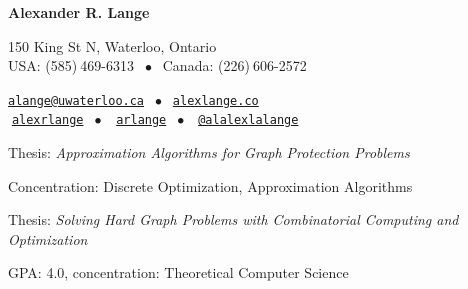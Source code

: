 \documentclass{article}
\begin{document}
\begin{center}
  {\Large \bf Alexander R. Lange}\\[0.5em]
  \begin{multicols}{2}
    {\small 150 King St N, Waterloo, Ontario\\
      USA: (585)$\:$469-6313 $\;\bullet\;$ Canada: (226)$\:$606-2572}
    \columnbreak

    {\small
      {\tt\href{mailto:alange@uwaterloo.ca}{alange@uwaterloo.ca}}
      $\;\bullet\;$
      {\tt\href{http://www.alexlange.co/}{alexlange.co}}}\\
    \faLinkedinSign 
    {\small
      $\;${\tt\href{https://www.linkedin.com/in/alexrlange}{alexrlange}} 
      $\;\bullet\;$}
    \faGithub 
    {\small $\;${\tt\href{https://github.com/arlange}{arlange}} $\;\bullet\:$}
    \faTwitter 
    {\small
      $\;${\tt\href{https://twitter.com/alalexlalange}{@alalexlalange}}}
  \end{multicols}
\end{center}

\vspace*{-1.5em}


\vspace*{-0.25em}

\begin{reslist}
  \item Thesis: \emph{Approximation Algorithms for Graph Protection Problems}
  \item Concentration: Discrete Optimization, Approximation Algorithms
\end{reslist}

\vspace*{0.25em}

\begin{reslist}
  \item Thesis: \emph{Solving Hard Graph Problems with Combinatorial
    Computing and Optimization}
 \item GPA: 4.0, concentration: Theoretical Computer Science
\end{reslist}


\vspace*{-0.5em}
\end{document}
